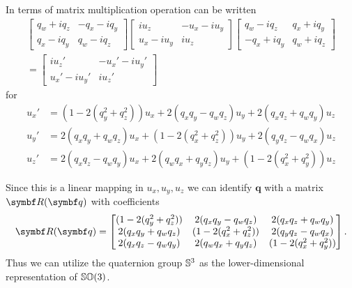 In terms of matrix multiplication operation can be written
\begin{equation}
  \begin{aligned}
    \begin{bmatrix}
      q_w + i q_z & -q_x - i q_y \\
      q_x - i q_y & q_w - i q_z
    \end{bmatrix} \begin{bmatrix}
      i u_z       & -u_x - i u_y \\
      u_x - i u_y & i u_z
    \end{bmatrix} \begin{bmatrix}
      q_w - i q_z   & q_x + i q_y \\
      - q_x + i q_y & q_w + i q_z
    \end{bmatrix} \\
    = \begin{bmatrix}
      i u_z'        & -u_x' - i u_y' \\
      u_x' - i u_y' & i u_z'
    \end{bmatrix}
  \end{aligned}
\end{equation}
for
\begin{equation}
  \begin{aligned}
    u_x' & = (1 - 2(q_y^2 + q_z^2)) u_x + 2(q_x q_y - q_w q_z) u_y + 2( q_x q_z + q_w q_y ) u_z   \\
    u_y' & = 2(q_x q_y + q_w q_z) u_x + (1 - 2 (q_x^2 + q_z^2)) u_y + 2( q_y q_z-q_w q_x) u_z     \\
    u_z' & = 2 (q_x q_z  - q_w q_y) u_x  + 2 (q_w q_x + q_y q_z) u_y + (1 - 2(q_x^2 + q_y^2)) u_z
  \end{aligned}
\end{equation}

Since this is a linear mapping in $u_x, u_y, u_z$ we can identify $\symbf{q}$ with a matrix $\bR(\bq)$ with coefficients
\begin{equation}
  \label{eq:quat_to_so3}
  \bR(\bq) = \begin{bmatrix}
    (1 - 2(q_y^2 + q_z^2)) & 2(q_x q_y - q_w q_z)    & 2( q_x q_z + q_w q_y ) \\
    2(q_x q_y + q_w q_z)   & (1 - 2 (q_x^2 + q_z^2)) & 2( q_y q_z-q_w q_x)    \\
    2 (q_x q_z  - q_w q_y) & 2 (q_w q_x + q_y q_z)   & (1 - 2(q_x^2 + q_y^2))
  \end{bmatrix}.
\end{equation}
Thus we can utilize the quaternion group ${\mathbb{S}^3}$ as the lower-dimensional representation of ${\mathbb{SO}(3)}$.

